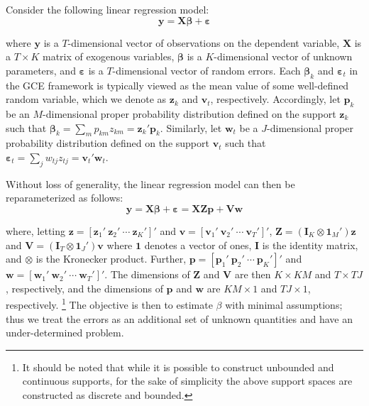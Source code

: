 \documentclass{elsarticle}
\begin{document}
Consider the following linear regression model: 
\begin{equation}
\mathbf{y} = \mathbf{X\beta} + \mathbf{\varepsilon}
\end{equation}

\noindent
where $\mathbf{y}$ is a $T$-dimensional vector of observations on the 
dependent variable, $\mathbf{X}$ is a $T\times K$ matrix of exogenous
variables, $\mathbf{\beta}$ is a $K$-dimensional vector of unknown 
parameters, and $\mathbf{\varepsilon}$ is a $T$-dimensional vector of 
random errors.
Each $\mathbf{\beta}_k$ and $\mathbf{\varepsilon}_t$ in the GCE 
framework is typically viewed as the mean value of some well-defined 
random variable, which we denote as $\mathbf{z}_k$ and $\mathbf{v}_t$, 
respectively.
Accordingly, let $\mathbf{p}_k$ be an $M$-dimensional proper 
probability distribution defined on the support $\mathbf{z}_k$ such that 
$\mathbf{\beta}_k = \sum_m p_{km}z_{km} = \mathbf{z}_k' 
\mathbf{p}_k$.
Similarly, let $\mathbf{w}_t$ be a $J$-dimensional proper probability 
distribution defined on the support $\mathbf{v}_t$ such that  
$\mathbf{\varepsilon}_t = \sum_j w_{tj}z_{tj} = \mathbf{v}_t' 
\mathbf{w}_t$.

Without loss of generality, the linear regression model can then be 
reparameterized as follows:
\begin{equation}
\mathbf{y} = \mathbf{X\beta} + \mathbf{\varepsilon} = 
\mathbf{X Z p} + \mathbf{V w}
\label{eq: reparm}
\end{equation}

\noindent
where, letting $\mathbf{z}=[\mathbf{z}_1' ~ \mathbf{z}_2' ~ \cdots ~ 
\mathbf{z}_K' ]'$ and $\mathbf{v}=[\mathbf{v}_1' ~ \mathbf{v}_2' ~ 
\cdots ~ \mathbf{v}_T' ]'$, 
$\mathbf{Z}= (\mathbf{I}_K \otimes \mathbf{1}_M')\mathbf{z}$ and
$\mathbf{V}= (\mathbf{I}_T \otimes \mathbf{1}_J')\mathbf{v}$
where $\mathbf{1}$ denotes a vector of ones, $\mathbf{I}$ is the 
identity matrix, and $\otimes$ is the Kronecker product.
Further, $\mathbf{p} = [\mathbf{p}_1' ~ \mathbf{p}_2' ~ \cdots ~ 
\mathbf{p}_K' ]'$ and $\mathbf{w} = [\mathbf{w}_1' ~ \mathbf{w}_2' 
~ \cdots ~ \mathbf{w}_T' ]'$.
The dimensions of $\mathbf{Z}$ and $\mathbf{V}$ are then 
$K \times KM$ and $T \times TJ$, respectively, and the dimensions of 
$\mathbf{p}$ and $\mathbf{w}$ are $KM \times 1$ and $TJ \times 1$, 
respectively.%
\footnote{It should be noted that while it is possible to construct unbounded 
and continuous supports, for the sake of simplicity the above support spaces 
are constructed as discrete and bounded.} 
The objective is then to estimate $\beta$ with minimal assumptions; thus
we treat the errors as an additional set of unknown quantities and have an
under-determined problem. 
\end{document}

